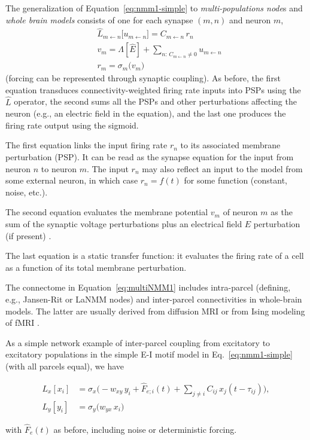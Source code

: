 \documentclass[12pt]{article}
\numberwithin{equation}{section}
\begin{document}
The generalization of Equation~\ref{eq:nmm1-simple} to \textit{multi-populations node}s and \textit{whole brain models }consists of one for each synapse $(m,n)$ and neuron $m$,
\begin{equation}
\begin{aligned}    \label{eq:multiNMM1}
&\hat L_{m\leftarrow n} \big[ u_{m\leftarrow n} \big] = C_{m\leftarrow n} \, r_n \\
&v_m = \Lambda[\hat E] + \sum_{ n:\,C_{m\leftarrow n} \neq 0 } u_{m\leftarrow n}  \\
&r_m = \sigma_m\big(v_m\big) 
\end{aligned}
\end{equation}
(forcing can be represented through synaptic coupling). As before, the first equation transduces connectivity-weighted firing rate inputs into PSPs using the $\hat L$ operator, the second sums all the PSPs and other perturbations affecting the neuron (e.g., an electric field in the equation), and the last one produces the firing rate output using the sigmoid.

The first equation links the input firing rate $r_n$ to its associated membrane perturbation (PSP). It can be read as the synapse equation for the input from neuron $n$ to neuron $m$. The input $r_n$  may also reflect an input to the model from some external neuron, in which case  $ r_n = f(t)$ for some function (constant, noise, etc.). 

The second equation evaluates the membrane potential $v_m$ of neuron $m$ as the sum of the synaptic voltage perturbations plus an electrical field $E$ perturbation (if present) \cite{ruffini_optimization_2014}. 

The last equation is a static transfer function: it evaluates the firing rate of a cell as a function of its total membrane perturbation.

The connectome in Equation~\ref{eq:multiNMM1} includes intra-parcel (defining, e.g., Jansen-Rit or LaNMM nodes) and inter-parcel connectivities in  whole-brain models. The latter are usually derived from diffusion MRI or from Ising modeling of fMRI \cite{mercadalBridgingLocalGlobal2025}.

 As a simple network example of inter-parcel coupling from excitatory to excitatory populations in the simple E-I motif model in Eq.~\ref{eq:nmm1-simple} (with all parcels equal), we have
 \begin{tcolorbox}[
  colback=gray!5,
  colframe=gray!5, %
  boxrule=0pt,
  enhanced, sharp corners,
  left=4pt, right=4pt, top=3pt, bottom=3pt,
  boxsep=2pt,
  before skip=6pt, after skip=6pt
]
\begin{equation} \label{eq:nmm1-coupled-example}
    \begin{aligned}
            L_x[x_i]
              &= \sigma_x\bigl(  - w_{xy}\,y_i + \hat F_{e;i}(t) + \sum_{j\neq i}  C_{ij} \, x_j(t-\tau_{ij}) \bigr),\\
           L_y[y_i] &= \sigma_y\bigl(w_{yx}\,x_i  \bigr) 
          \end{aligned}
\end{equation}
\end{tcolorbox}
with $\hat F_e(t)$ as before, including noise or deterministic forcing. 
\end{document}
